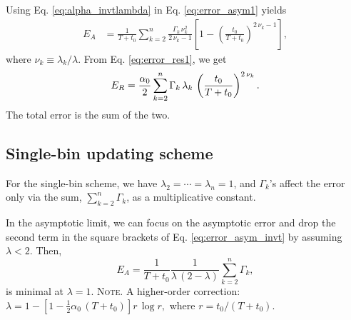 \documentclass[reprint, floatfix]{revtex4-1}
\newcommand{\note}[1]{{\color{DarkGreen}\footnotesize \textsc{Note.} #1}}
\newcommand{\Err}{E}
\begin{document}
Using Eq. \eqref{eq:alpha_invtlambda}
in Eq. \eqref{eq:error_asym1} yields
%
\begin{align}
  \Err_A
  &=
  \frac{    1    }
       { T + t_0 }
  \sum_{k = 2}^n
    \frac{ \Gamma_k \, \nu_k^2 }
         {    2 \, \nu_k - 1   }
  \left[
    1 - \left(
          \frac {     t_0 }
                { T + t_0 }
        \right)^{ 2 \, \nu_k - 1 }
  \right]
  ,
\label{eq:error_asym_invt}
\end{align}
%
where $\nu_k \equiv \lambda_k / \lambda$.
%
From Eq. \eqref{eq:error_res1},
we get
%
\begin{equation}
  \Err_R
  =
  \frac { \alpha_0 } { 2 }
  \sum_{k = 2}^n
  \Gamma_k \, \lambda_k \,
  \left(
      \frac{   t_0   }
           { T + t_0 }
  \right)^{ 2 \, \nu_k }
  .
\notag
\end{equation}
%
The total error is the sum of the two.
%
%




\subsection{\label{sec:invt_singlebin}
  Single-bin updating scheme
}



For the single-bin scheme, we have
$\lambda_2 = \cdots = \lambda_n = 1$,
and
$\Gamma_k$'s affect the error
only via the sum, $\sum_{k = 2}^n \Gamma_k$,
as a multiplicative constant.

In the asymptotic limit,
we can focus on the asymptotic error
and drop the second term in the square brackets
of Eq. \eqref{eq:error_asym_invt}
by assuming $\lambda < 2$.
%
Then,
$$
  E_A
  =
  \frac { 1 } { T + t_0 }
  \frac {             1            }
        { \lambda \, (2 - \lambda) }
  \sum_{ k = 2 }^n \Gamma_k
  ,
$$
is minimal at $\lambda = 1$.
%
\note{A higher-order correction:
  $
  \lambda = 1 -
  \left[
    1 - \frac 1 2 \alpha_0 \, (T+t_0)
  \right] r \, \log r
  ,
  $
  where $r = t_0 / (T + t_0)$.
}
\end{document}

